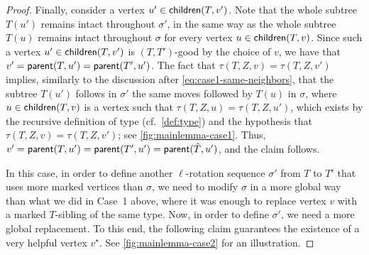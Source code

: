 \documentclass[a4paper,UKenglish,cleveref, autoref, thm-restate]{lipics-v2021}
\newenvironment{cproof}{\proof[Proof of claim]\renewcommand\qedsymbol{$\diamond$}}{\endproof}
\newcommand{\parent}{{\sf parent}\xspace}
\newcommand{\child}{{\sf children}\xspace}
\begin{document}
\begin{proof}
\begin{cproof}
Finally, consider a vertex $u' \in \child(T,v')$. Note that the whole subtree $T(u')$ remains intact throughout $\sigma'$, in the same way as the whole subtree $T(u)$ remains intact throughout $\sigma$ for every vertex $u \in \child(T,v)$. Since such a vertex $u' \in \child(T,v')$ is $(T,T')$-good by the choice of $v$, we have that $v' = \parent(T,u')= \parent(T',u')$. The fact that $\tau(T,Z,v)=\tau(T,Z,v')$ implies, similarly to the discussion after
\autoref{eq:case1-same-neighbors}, that the subtree $T(u')$ follows in $\sigma'$ the same moves followed by $T(u)$ in $\sigma$, where $u \in \child(T,v)$ is a vertex such that $\tau(T,Z,u)=\tau(T,Z,u')$, which exists by the recursive definition of type (cf.~\autoref{def:type}) and the hypothesis that $\tau(T,Z,v)=\tau(T,Z,v')$; see \autoref{fig:mainlemma-case1}. Thus, $v' = \parent(T,u')= \parent(T',u') = \parent(\hat{T},u')$, and the claim follows.
\end{cproof}

\medskip
\noindent{}
\medskip

In this case, in order to define another $\ell$-rotation sequence $\sigma'$ from $T$ to $T'$ that uses more marked vertices than $\sigma$, we need to modify $\sigma$ in a more global way than what we did in Case~1 above, where it was enough to replace vertex $v$ with a marked $T$-sibling of the same type. Now, in order to define $\sigma'$, we need a more global replacement. To this end, the following claim guarantees the existence of a very helpful vertex $v^{\star}$. See \autoref{fig:mainlemma-case2} for an illustration.


\end{proof}
\end{document}
